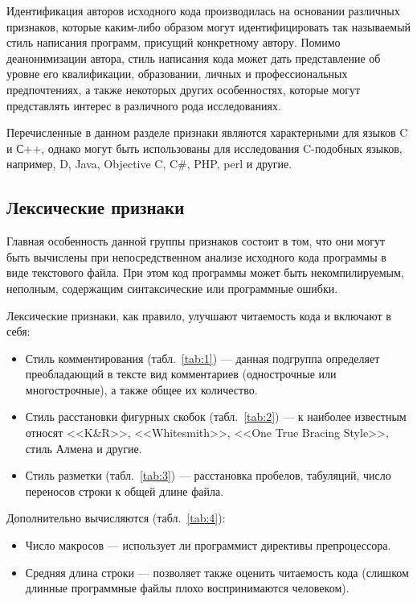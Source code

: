 Идентификация авторов исходного кода производилась на основании различных признаков, которые каким-либо 
образом могут идентифицировать так называемый стиль написания программ, присущий конкретному автору. 
Помимо деанонимизации автора, стиль написания кода может дать представление об уровне его квалификации, 
образовании, личных и профессиональных предпочтениях, а также некоторых других особенностях, которые могут 
представлять интерес в различного рода исследованиях. 

Перечисленные в данном разделе признаки являются характерными для языков C и С++, однако могут быть 
использованы для исследования C-подобных языков, например, D, Java, Objective C, C\#, PHP, perl и другие.

\subsection{Лексические признаки}

Главная особенность данной группы признаков состоит в том, что они могут быть вычислены при 
непосредственном анализе исходного кода программы в виде текстового файла. 
При этом код программы может быть некомпилируемым, неполным, содержащим
синтаксические или программные ошибки.

Лексические признаки, как правило, улучшают читаемость кода и включают в себя:

\begin{itemize}
 \item Стиль комментирования (табл.~\ref{tab:1}) --- данная подгруппа определяет преобладающий в тексте вид комментариев 
 (однострочные или многострочные), а также общее их количество.
 \item Стиль расстановки фигурных скобок (табл.~\ref{tab:2}) --- к наиболее известным относят <<K\&R>>, <<Whitesmith>>,
 <<One True Bracing Style>>, стиль Алмена и другие.~\cite{bracing_styles} 
 \item Стиль разметки (табл.~\ref{tab:3}) --- расстановка пробелов, табуляций, число переносов строки к общей длине файла.
\end{itemize}


Дополнительно вычисляются (табл.~\ref{tab:4}):
\begin{itemize}
 \item Число макросов --- использует ли программист директивы препроцессора.\cite{macros}
 \item Средняя длина строки --- позволяет также оценить читаемость кода (слишком длинные программные файлы
 плохо воспринимаются человеком).
\end{itemize}



